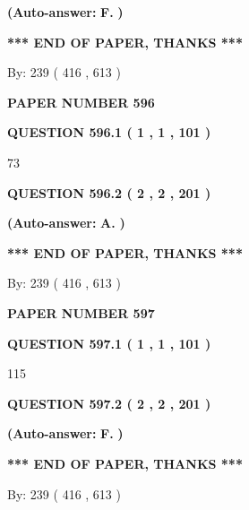 \documentclass[12pt]{article}
\begin{document}
 
{\textbf{(Auto-answer:}}
{\textbf{\large{
F.}}}
{\textbf{)}}
 
 
   
   
   
   
\vspace{1.0in} 
{\textbf{\large{ *** END OF PAPER, THANKS *** }}} 
   
   
\hspace{1.0in} By: 
 239 ( 416 ,  613 )
   
   
   
   
\newpage 
\setcounter{page}{ 
   596001 } 
   
   
 {\textbf{ \Large{ PAPER NUMBER  596  }}}
   
   
   
   
  
  
{\textbf{\large{QUESTION
596.1 
 ( 1 , 1 , 101 )
}}}

73
  
  
{\textbf{\large{QUESTION
596.2 
 ( 2 , 2 , 201 )
}}}
 
 
{\textbf{(Auto-answer:}}
{\textbf{\large{
A.}}}
{\textbf{)}}
 
 
   
   
   
   
\vspace{1.0in} 
{\textbf{\large{ *** END OF PAPER, THANKS *** }}} 
   
   
\hspace{1.0in} By: 
 239 ( 416 ,  613 )
   
   
   
   
\newpage 
\setcounter{page}{ 
   597001 } 
   
   
 {\textbf{ \Large{ PAPER NUMBER  597  }}}
   
   
   
   
  
  
{\textbf{\large{QUESTION
597.1 
 ( 1 , 1 , 101 )
}}}

115
  
  
{\textbf{\large{QUESTION
597.2 
 ( 2 , 2 , 201 )
}}}
 
 
{\textbf{(Auto-answer:}}
{\textbf{\large{
F.}}}
{\textbf{)}}
 
 
   
   
   
   
\vspace{1.0in} 
{\textbf{\large{ *** END OF PAPER, THANKS *** }}} 
   
   
\hspace{1.0in} By: 
 239 ( 416 ,  613 )
   
   
   
\end{document}
